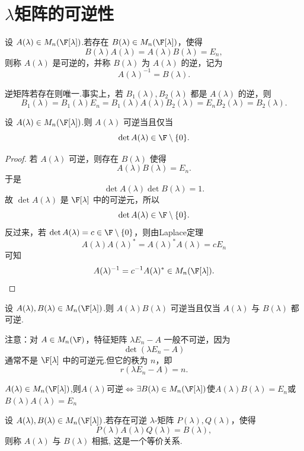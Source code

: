 \section{$\lambda$矩阵的可逆性}

\begin{definition}[可逆 $\lambda$-矩阵]
	设 $A(\lambda)\in M_n(\F[\lambda])$.若存在 $B(\lambda)\in M_n(\F[\lambda])$，使得
	\[
	B(\lambda)A(\lambda)=A(\lambda)B(\lambda)=E_n,
	\]
	则称 $A(\lambda)$ 是可逆的，并称 $B(\lambda)$ 为 $A(\lambda)$ 的逆，记为
	\[
	A(\lambda)^{-1}=B(\lambda).
	\]
\end{definition}

	逆矩阵若存在则唯一.事实上，若 $B_1(\lambda),B_2(\lambda)$ 都是 $A(\lambda)$ 的逆，则
	\[
	B_1(\lambda)=B_1(\lambda)E_n
	=B_1(\lambda)A(\lambda)B_2(\lambda)
	=E_nB_2(\lambda)=B_2(\lambda).
	\]

\begin{lemma}
	设 $A(\lambda)\in M_n(\F[\lambda])$.则 $A(\lambda)$ 可逆当且仅当
	\[
	\det A(\lambda)\in \F\setminus\{0\}.
	\]
\end{lemma}

\begin{proof}
	若 $A(\lambda)$ 可逆，则存在 $B(\lambda)$ 使得
	\[
	A(\lambda)B(\lambda)=E_n.
	\]
	于是
	\[
	\det A(\lambda)\det B(\lambda)=1.
	\]
	故 $\det A(\lambda)$ 是 $\F[\lambda]$ 中的可逆元，所以
	\[
	\det A(\lambda)\in\F\setminus\{0\}.
	\]
	反过来，若 $\det A(\lambda)=c\in\F\setminus\{0\}$，则由Laplace定理
	\[
	A(\lambda)A(\lambda)^*=A(\lambda)^*A(\lambda)=cE_n
	\]
	可知
	\[
	A(\lambda)^{-1}=c^{-1}A(\lambda)^*\in M_n(\F[\lambda]).
	\]
\end{proof}

\begin{corollary}
	设 $A(\lambda),B(\lambda)\in M_n(\F[\lambda])$.则 $A(\lambda)B(\lambda)$ 可逆当且仅当 $A(\lambda)$ 与 $B(\lambda)$ 都可逆.
\end{corollary}

注意：对 $A\in M_n(\F)$，特征矩阵 $\lambda E_n-A$ 一般不可逆，因为
\[
\det(\lambda E_n-A)
\]
通常不是 $\F[\lambda]$ 中的可逆元.但它的秩为 $n$，即
\[
r(\lambda E_n-A)=n.
\]
\begin{corollary}
	$A(\lambda)\in M_n(\F[\lambda])$,则$A(\lambda)$可逆$\iff$$\exists B(\lambda)\in M_n(\F[\lambda])$使$A(\lambda)B(\lambda)=E_n $或$B(\lambda)A(\lambda)=E_n $
\end{corollary}

\begin{definition}[相抵]
	设 $A(\lambda),B(\lambda)\in M_n(\F[\lambda])$.若存在可逆 $\lambda$-矩阵 $P(\lambda),Q(\lambda)$，使得
	\[
	P(\lambda)A(\lambda)Q(\lambda)=B(\lambda),
	\]
	则称 $A(\lambda)$ 与 $B(\lambda)$ 相抵,
	这是一个等价关系.
\end{definition}

